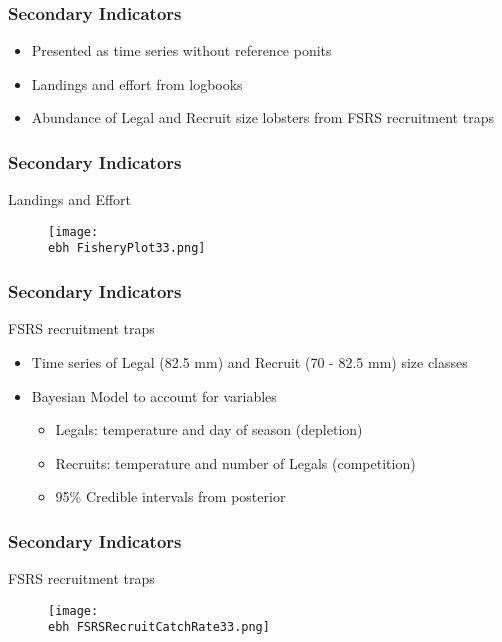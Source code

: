 \documentclass{beamer}
\newcommand{\ebh}{\string~/bio.data/bio.lobster/figures/Assessment/LFA33/} %
\begin{document}
\begin{frame}
\frametitle{Secondary Indicators}
\begin{itemize}
    \setlength\itemsep{2em}
\item Presented as time series without reference ponits
\item Landings and effort from logbooks
\item Abundance of Legal and Recruit size lobsters from FSRS recruitment traps 
\end{itemize}
\end{frame}



\begin{frame}
\frametitle{Secondary Indicators}
Landings and Effort
\begin{figure}
        \begin{center}
            \texttt{[image: \\ebh FisheryPlot33.png]}
        \end{center}
    \end{figure}
\end{frame}



\begin{frame}
\frametitle{Secondary Indicators}
FSRS recruitment traps
\begin{itemize}
\item Time series of Legal (82.5 mm) and Recruit (70 - 82.5 mm) size classes 
\item Bayesian Model to account for variables
\begin{itemize}
\item Legals: temperature and day of season (depletion) 
\item Recruits: temperature and number of Legals (competition) 
\item 95\% Credible intervals from posterior
\end{itemize}
\end{itemize}
\end{frame}

\begin{frame}
\frametitle{Secondary Indicators}
FSRS recruitment traps
\begin{figure}
        \begin{center}
            \texttt{[image: \\ebh FSRSRecruitCatchRate33.png]}
        \end{center}
    \end{figure}
\end{frame}
\end{document}
